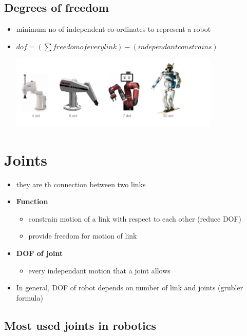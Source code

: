 \documentclass{article}
\begin{document}
\subsection{Degrees of freedom }
\begin{itemize}
	\item minimum no of independent co-ordinates to represent a robot
	\item $dof = (\sum freedom of every link) - (independant constrains)$
	      \begin{center}
		      \includegraphics[width=10cm]{img/diffrent-dof.png}
	      \end{center}
\end{itemize}
\section{Joints}
\begin{itemize}
	\item they are th connection between two links
	\item \textbf{Function}
	      \begin{itemize}
		      \item constrain motion of a link with respect to each other (reduce DOF)
		      \item provide freedom for motion of link
	      \end{itemize}
	\item \textbf{DOF of joint}
	      \begin{itemize}
		      \item every independant motion that a joint allows
	      \end{itemize}
	\item In general, DOF of robot depends on number of link and joints (grubler formula)

\end{itemize}
\newpage
\subsection{Most used joints in robotics}
\end{document}
